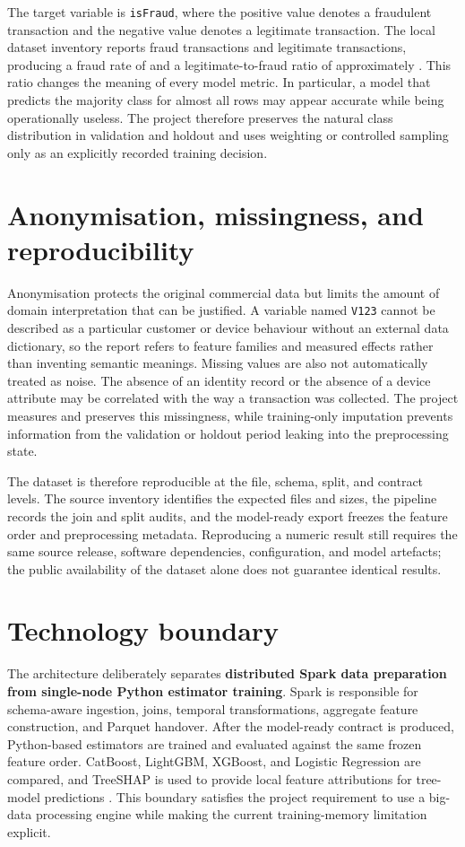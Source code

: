 The target variable is \texttt{isFraud}, where the positive value denotes a
fraudulent transaction and the negative value denotes a legitimate transaction.
The local dataset inventory reports  fraud transactions and
 legitimate transactions, producing a fraud rate of
 and a legitimate-to-fraud ratio of approximately .
This ratio changes the meaning of every model metric. In particular, a model
that predicts the majority class for almost all rows may appear accurate while
being operationally useless. The project therefore preserves the natural
class distribution in validation and holdout and uses weighting or controlled
sampling only as an explicitly recorded training decision.

\section{Anonymisation, missingness, and reproducibility}

Anonymisation protects the original commercial data but limits the amount of
domain interpretation that can be justified. A variable named \texttt{V123}
cannot be described as a particular customer or device behaviour without an
external data dictionary, so the report refers to feature families and
measured effects rather than inventing semantic meanings. Missing values are
also not automatically treated as noise. The absence of an identity record or
the absence of a device attribute may be correlated with the way a transaction
was collected. The project measures and preserves this missingness, while
training-only imputation prevents information from the validation or holdout
period leaking into the preprocessing state.

The dataset is therefore reproducible at the file, schema, split, and contract
levels. The source inventory identifies the expected files and sizes, the
pipeline records the join and split audits, and the model-ready export freezes
the feature order and preprocessing metadata. Reproducing a numeric result
still requires the same source release, software dependencies, configuration,
and model artefacts; the public availability of the dataset alone does not
guarantee identical results.

\section{Technology boundary}

The architecture deliberately separates \textbf{distributed Spark data preparation from single-node Python estimator training}. Spark is responsible for schema-aware ingestion, joins, temporal transformations, aggregate feature construction, and Parquet handover. After the model-ready contract is produced, Python-based estimators are trained and evaluated against the same frozen feature order. CatBoost, LightGBM, XGBoost, and Logistic Regression are compared, and TreeSHAP is used to provide local feature attributions for tree-model predictions \parencite{lundberg2017shap}. This boundary satisfies the project requirement to use a big-data processing engine while making the current training-memory limitation explicit.

